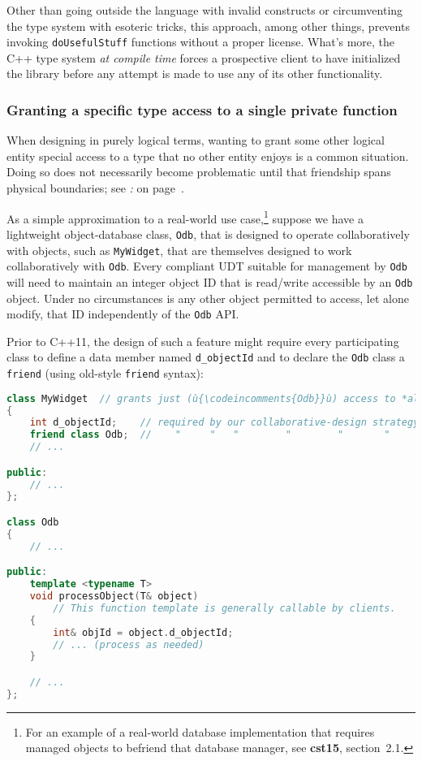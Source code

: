 \noindent Other than going outside the language with invalid constructs or circumventing the
type system with esoteric tricks, this approach, among other things,
prevents invoking \texttt{doUsefulStuff} functions without a proper
license. What's more, the C++ type system \emph{at compile time} forces
a prospective client to have initialized the library before any attempt
is made to use any of its other functionality.

\subsubsection[Granting a specific type access to a single {\tt private} function]{Granting a specific type access to a single {\SubsubsecCode private} function}\label{granting-a-specific-type-access-to-a-single-private-function}

When designing in purely logical terms, wanting to grant some other
logical entity special access to a type that no other entity enjoys is a
common situation. Doing so does not necessarily become problematic until
that friendship spans physical boundaries; see \textit{: } on page~\pageref{long-distance-friendship}.

As a simple approximation to a real-world use
case,\footnote{For an example of a real-world database
implementation that requires managed objects to befriend that database
manager, see \textbf{cst15}, section~2.1.} suppose we have a lightweight object-database class, \texttt{Odb}, that is designed to operate
collaboratively with objects, such as \texttt{MyWidget}, that are
themselves designed to work collaboratively with \texttt{Odb}. Every compliant UDT
suitable for management by \texttt{Odb} will need to maintain an integer
object ID that is read/write accessible by an \texttt{Odb} object. Under
no circumstances is any other object permitted to access, let alone
modify, that ID independently of the \texttt{Odb} API.

Prior to C++11, the design of such a feature might require every
participating class to define a data member named \texttt{d\_objectId}
and to declare the \texttt{Odb} class a \texttt{friend} (using old-style
\texttt{friend} syntax):

\begin{lstlisting}[language=C++]
class MyWidget  // grants just (ù{\codeincomments{Odb}}ù) access to *all* of its private data
{
    int d_objectId;    // required by our collaborative-design strategy
    friend class Odb;  //    "     "   "        "        "       "
    // ...

public:
    // ...
};

class Odb
{
    // ...

public:
    template <typename T>
    void processObject(T& object)
        // This function template is generally callable by clients.
    {
        int& objId = object.d_objectId;
        // ... (process as needed)
    }

    // ...
};
\end{lstlisting}

